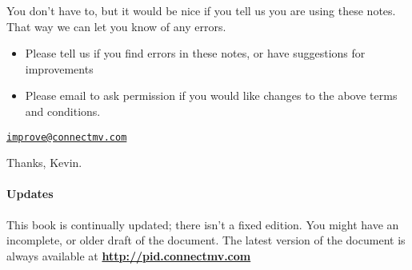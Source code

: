 \vskip12pt

You don't have to, but it would be nice if you tell us you are using these notes. That way we can let you know of any errors.
\begin{itemize}
	\item	Please tell us if you find errors in these notes, or have suggestions for improvements
	\item	Please email to ask permission if you would like changes to the above terms and conditions.
\end{itemize}

\begin{center}
	{\LARGE \texttt{\href{mailto:improve@connectmv.com}{improve@connectmv.com}}}
\end{center}

Thanks, Kevin.

\vskip48pt

\paragraph{Updates}

This book is continually updated; there isn't a fixed edition. You might have an incomplete, or older draft of the document.  The latest version of the document is always available at \textbf{\href{http://pid.connectmv.com}{http://pid.connectmv.com}}








